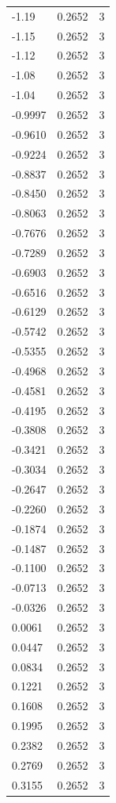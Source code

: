 \begin{longtable}{lrr}
  -1.19 & 0.2652 & 3 \\
  -1.15 & 0.2652 & 3 \\
  -1.12 & 0.2652 & 3 \\
  -1.08 & 0.2652 & 3 \\
  -1.04 & 0.2652 & 3 \\
  -0.9997 & 0.2652 & 3 \\
  -0.9610 & 0.2652 & 3 \\
  -0.9224 & 0.2652 & 3 \\
  -0.8837 & 0.2652 & 3 \\
  -0.8450 & 0.2652 & 3 \\
  -0.8063 & 0.2652 & 3 \\
  -0.7676 & 0.2652 & 3 \\
  -0.7289 & 0.2652 & 3 \\
  -0.6903 & 0.2652 & 3 \\
  -0.6516 & 0.2652 & 3 \\
  -0.6129 & 0.2652 & 3 \\
  -0.5742 & 0.2652 & 3 \\
  -0.5355 & 0.2652 & 3 \\
  -0.4968 & 0.2652 & 3 \\
  -0.4581 & 0.2652 & 3 \\
  -0.4195 & 0.2652 & 3 \\
  -0.3808 & 0.2652 & 3 \\
  -0.3421 & 0.2652 & 3 \\
  -0.3034 & 0.2652 & 3 \\
  -0.2647 & 0.2652 & 3 \\
  -0.2260 & 0.2652 & 3 \\
  -0.1874 & 0.2652 & 3 \\
  -0.1487 & 0.2652 & 3 \\
  -0.1100 & 0.2652 & 3 \\
  -0.0713 & 0.2652 & 3 \\
  -0.0326 & 0.2652 & 3 \\
  0.0061 & 0.2652 & 3 \\
  0.0447 & 0.2652 & 3 \\
  0.0834 & 0.2652 & 3 \\
  0.1221 & 0.2652 & 3 \\
  0.1608 & 0.2652 & 3 \\
  0.1995 & 0.2652 & 3 \\
  0.2382 & 0.2652 & 3 \\
  0.2769 & 0.2652 & 3 \\
  0.3155 & 0.2652 & 3 \\

\end{longtable}

